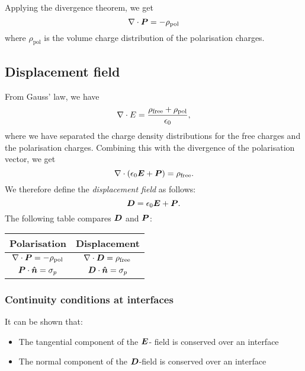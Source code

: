         Applying the divergence theorem, we get
        \begin{equation}
            \nabla \cdot \bm{P} = - \rho_{\text{pol}}
        \end{equation}
        where $\rho_{\text{pol}}$ is the volume charge distribution of the polarisation charges.

\subsection{Displacement field}
    From Gauss' law, we have 
    \begin{equation*}
        \nabla \cdot E = \frac{\rho_{\text{free}} + \rho_{\text{pol}}}{\epsilon_0},
    \end{equation*}
    where we have separated the charge density distributions for the free charges and the polarisation charges. 
    Combining this with the divergence of the polarisation vector, we get 
    \begin{equation*}
        \nabla \cdot \left(\epsilon_0\bm{E} + \bm{P}\right) = \rho_{\text{free}}.
    \end{equation*}
    We therefore define the \textit{displacement field} as follows:
    \begin{equation}
        \bm{D} = \epsilon_0\bm{E} + \bm{P}.
    \end{equation}
    The following table compares $\bm{D}$ and $\bm{P}$:
    \begin{center}
        \begin{tabular}{ c|c } 
        Polarisation & Displacement \\
        \hline
         $\nabla \cdot \bm{P} = -\rho_{\text{pol}}$ & $\nabla \cdot \bm{D} = \rho_{\text{free}}$ \\
         $\p \cdot \hat{n} = \sigma_p$ & $\D \cdot \hat{n} = \sigma_p$
        \end{tabular}
    \end{center}

    \subsubsection{Continuity conditions at interfaces}
        It can be shown that:
        \begin{itemize}
            \item The tangential component of the $\bm{E}$- field is conserved over an interface
            \item The normal component of the $\bm{D}$-field is conserved over an interface
        \end{itemize}

